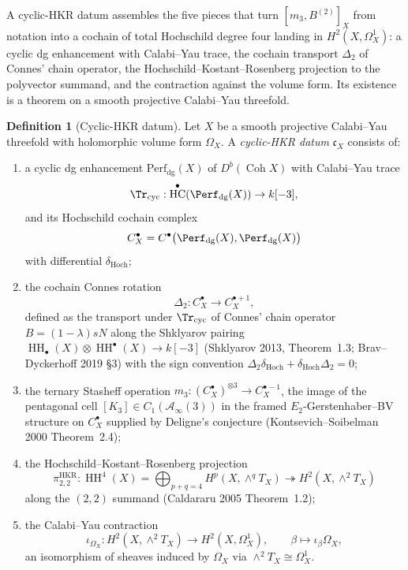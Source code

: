 \documentclass[11pt,reqno]{amsart}
\theoremstyle{plain}
\theoremstyle{definition}
\newtheorem{definition}[theorem]{Definition}
\theoremstyle{remark}
\DeclareMathOperator{\Coh}{Coh}
\DeclareMathOperator{\HH}{HH}
\DeclareMathOperator{\HC}{HC}
\newcommand{\cA}{\mathcal{A}}
\begin{document}
A cyclic-HKR datum assembles the five pieces that turn
$[m_3,B^{(2)}]_X$ from notation into a cochain of total Hochschild
degree four landing in $H^2(X,\Omega^1_X)$: a cyclic dg enhancement
with Calabi--Yau trace, the cochain transport $\Delta_2$ of Connes'
chain operator, the Hochschild--Kostant--Rosenberg projection to the
polyvector summand, and the contraction against the volume form. Its
existence is a theorem on a smooth projective Calabi--Yau threefold.

\begin{definition}[Cyclic-HKR datum]
\label{def:cyclic-hkr-datum}
Let $X$ be a smooth projective Calabi--Yau threefold with holomorphic
volume form $\Omega_X$. A \emph{cyclic-HKR datum}
$\mathfrak c_X$ consists of:
\begin{enumerate}[label=\textup{(AC\arabic*)}]
  \item a cyclic dg enhancement
  $\mathrm{Perf}_{\mathrm{dg}}(X)$ of $D^b(\Coh X)$ with
  Calabi--Yau trace
  \[
    \Tr_{\mathrm{cyc}}:\HC^\bullet(\Perf_{\mathrm{dg}}(X))\to k[-3],
  \]
  and its Hochschild cochain complex
  \[
    C^\bullet_X=
    C^\bullet\bigl(\Perf_{\mathrm{dg}}(X),
    \Perf_{\mathrm{dg}}(X)\bigr)
  \]
  with differential $\delta_{\mathrm{Hoch}}$;
  \item the cochain Connes rotation
  \[
    \Delta_2:C^\bullet_X\to C^{\bullet+1}_X,
  \]
  defined as the transport under $\Tr_{\mathrm{cyc}}$ of Connes' chain
  operator $B=(1-\lambda)sN$ along the Shklyarov pairing
  $\HH_\bullet(X)\otimes\HH^\bullet(X)\to k[-3]$
  (Shklyarov 2013, Theorem~1.3; Brav--Dyckerhoff 2019
  \S3) with the sign convention
  $\Delta_2\delta_{\mathrm{Hoch}}+\delta_{\mathrm{Hoch}}\Delta_2=0$;
  \item the ternary Stasheff operation
  $m_3:(C^\bullet_X)^{\otimes 3}\to C^{\bullet-1}_X$, the image of the
  pentagonal cell $[K_3]\in C_1(\cA_\infty(3))$ in the framed
  $E_2$-Gerstenhaber--BV structure on $C^\bullet_X$ supplied by
  Deligne's conjecture (Kontsevich--Soibelman 2000 Theorem~2.4);
  \item the Hochschild--Kostant--Rosenberg projection
  \[
    \pi^{\mathrm{HKR}}_{2,2}:
    \HH^4(X)=\bigoplus_{p+q=4}H^p(X,\wedge^qT_X)
    \twoheadrightarrow H^2(X,\wedge^2T_X)
  \]
  along the $(2,2)$ summand (Caldararu 2005 Theorem~1.2);
  \item the Calabi--Yau contraction
  \[
    \iota_{\Omega_X}:H^2(X,\wedge^2T_X)\to H^2(X,\Omega^1_X),
    \qquad
    \beta\mapsto\iota_\beta\Omega_X,
  \]
  an isomorphism of sheaves induced by $\Omega_X$ via
  $\wedge^2T_X\cong\Omega^1_X$.
\end{enumerate}
\end{definition}
\end{document}
